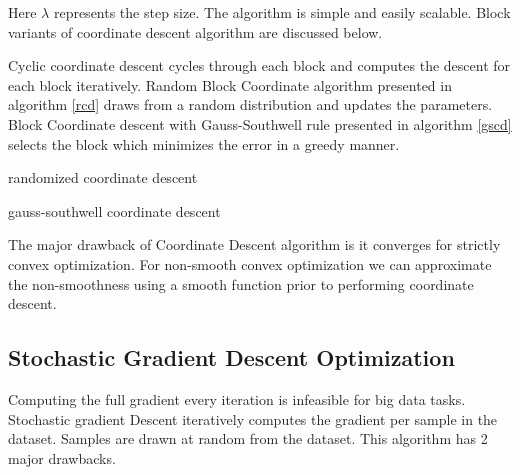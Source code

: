 \documentclass[sigconf]{acmart}
\begin{document}
Here $\lambda$ represents the step size. The algorithm is simple and easily scalable. Block variants of coordinate descent algorithm are discussed below.

Cyclic coordinate descent cycles through each block and computes the descent for each block iteratively. Random Block Coordinate algorithm \cite{pmlrv37nutini15} presented in algorithm \ref{rcd} draws from a random distribution and updates the parameters. Block Coordinate descent with Gauss-Southwell \cite{pmlrv37nutini15} rule presented in algorithm \ref{gscd} selects the block which minimizes the error in a greedy manner.

\begin{algorithm}

\caption{randomized coordinate descent} \label{rcd}

\begin{algorithmic}[1] 
\EndFor
\end{algorithmic}

\end{algorithm}

\begin{algorithm}

\caption{gauss-southwell coordinate descent} \label{gscd}

\begin{algorithmic}[1] 
\State{select $i = argmax(\nabla^t f(x_i)]) $ }
\EndFor
\end{algorithmic}

\end{algorithm}

The major drawback of Coordinate Descent algorithm is it converges for strictly convex optimization. For non-smooth convex optimization we can approximate the non-smoothness using a smooth function prior to performing coordinate descent. 

\subsection{Stochastic Gradient Descent Optimization}

Computing the full gradient every iteration is infeasible for big data tasks. Stochastic gradient Descent \cite{Bottou2010} iteratively computes the gradient per sample in the dataset. Samples are drawn at random from the dataset. This algorithm has 2 major drawbacks.
\end{document}
